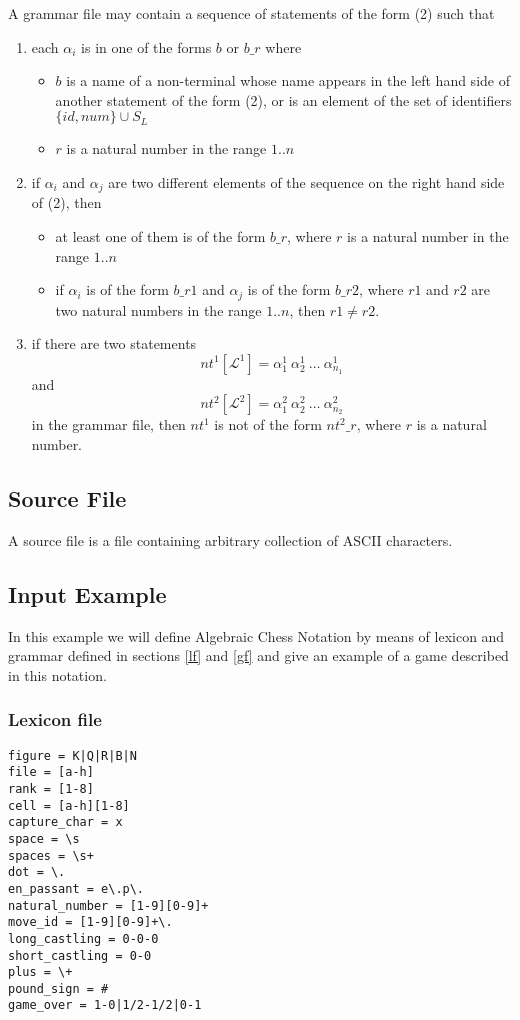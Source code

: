 \documentclass[a4paper,10pt]{article}
\begin{document}
A grammar file may contain a sequence of statements of the form (2) such that
\begin{enumerate}
\item each $\alpha_i$ is in one of the forms $b$ or $b\_r$ where 
\begin{itemize}
\item $b$ is a name of a non-terminal whose name appears in the left hand side of another statement of the form (2), or is an element of the set of identifiers $\{id,num\}\cup S_L$
\item $r$ is a natural number in the range $1..n$
\end{itemize}
\item if $\alpha_i$ and $\alpha_j$ are two different elements of the sequence on the right hand side of (2), then 
\begin{itemize}
\item at least one of them is of the form $b\_r$, where $r$ is a natural number in the range $1..n$
\item if $\alpha_i$ is of the form $b\_{r1}$ and $\alpha_j$ is of the form $b\_{r2}$, where $r1$ and $r2$ are two natural numbers in the range $1..n$, then $r1 \not= r2$.
\end{itemize} 
\item if there are two statements 
$$ nt^1[\mathcal{L^1}] = \alpha_1^1~\alpha_2^1~\ldots~\alpha_{n_1}^1  $$
and
$$ nt^2[\mathcal{L^2}] = \alpha_1^2~\alpha_2^2~\ldots~\alpha_{n_2}^2  $$
in the grammar file, then $nt^1$ is not of the form $nt^2\_r$, where $r$ is a natural number.
\end{enumerate}
 




\subsection{Source File}\label{sf}
A source file is a file containing arbitrary collection of ASCII characters.

\subsection{Input Example}\label{ie} 
In this example we will define Algebraic Chess Notation \cite{chess} by means of lexicon and grammar defined in sections \ref{lf} and \ref{gf} and give an example of a game described in this notation. 
\subsubsection{Lexicon file}
\begin{verbatim}
figure = K|Q|R|B|N
file = [a-h]
rank = [1-8]
cell = [a-h][1-8]
capture_char = x
space = \s
spaces = \s+
dot = \.
en_passant = e\.p\.
natural_number = [1-9][0-9]+
move_id = [1-9][0-9]+\.
long_castling = 0-0-0
short_castling = 0-0
plus = \+
pound_sign = #
game_over = 1-0|1/2-1/2|0-1
\end{verbatim}
\end{document}
